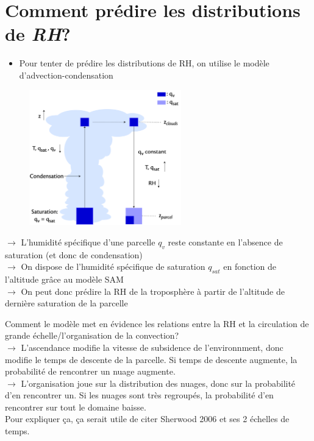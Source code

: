 \documentclass[10pt]{beamer}
\begin{document}
\section*{Comment prédire les distributions de \textit{RH}?}
\begin{frame}{\secname}
     \begin{itemize}
         \item Pour tenter de prédire les distributions de RH, on utilise le modèle d'advection-condensation \autocite{pierrehumbertRelativeHumidityAtmosphere2007,Vallis2017}
     \end{itemize}
     \begin{figure}[hbtp]
         \centering
         \includegraphics[width=6.6cm]{Figures/advec-condens.png}
     \end{figure}
\end{frame}

\begin{frame}{\secname}
    $\rightarrow$ L'humidité spécifique d'une parcelle $q_v$ reste constante en l'absence de saturation (et donc de condensation) \\ \vspace{1cm}
    $\rightarrow$ On dispose de l'humidité spécifique de saturation $q_{sat}$ en fonction de l'altitude grâce au modèle SAM  \\ \vspace{1cm}
    $\rightarrow$ On peut donc prédire la RH de la troposphère à partir de l'altitude de dernière saturation de la parcelle
\end{frame}

\begin{frame}{\secname}
    Comment le modèle met en évidence les relations entre la RH et la circulation de grande échelle/l'organisation de la convection? \\ \vspace{1cm}
    $\rightarrow$ L'ascendance modifie la vitesse de subsidence de l'environnment, donc modifie le temps de descente de la parcelle. Si temps de descente augmente, la probabilité de rencontrer un nuage augmente. \\ \vspace{1cm}
    $\rightarrow$ L'organisation joue sur la distribution des nuages, donc sur la probabilité d'en rencontrer un. Si les nuages sont très regroupés, la probabilité d'en rencontrer sur tout le domaine baisse. \\ 
    Pour expliquer ça, ça serait utile de citer Sherwood 2006 et ses 2 échelles de temps.
\end{frame}
\end{document}
